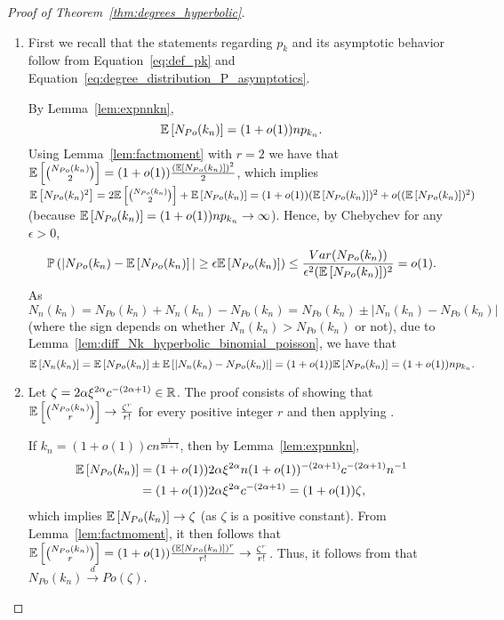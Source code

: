 \begin{proof}[Proof of Theorem~\ref{thm:degrees_hyperbolic}] \hfill\\
\begin{enumerate}[\upshape (i)]
\item  First we recall that the statements regarding $p_k$ and its asymptotic behavior follow from Equation~\ref{eq:def_pk} and Equation~\ref{eq:degree_distribution_P_asymptotics}.

By Lemma~\ref{lem:expnnkn},
\[
\mathbb{E}\left[{ N_{Po}(k_n) }\right]=(1+o(1))n p_{k_n}.
\]
Using Lemma~\ref{lem:factmoment} with $r=2$ we have that $\mathbb{E}\left[{N_{Po}(k_n) \choose 2}\right] = (1+o(1))\frac{(\mathbb{E}\left[ N_{Po}(k_n)\right])^2}{2}$, which implies $\mathbb{E}\left[N_{Po}(k_n)^2\right] = 2\mathbb{E}\left[{N_{Po}(k_n) \choose 2}\right] +\mathbb{E}\left[N_{Po}(k_n)\right] = (1+o(1))(\mathbb{E}\left[ N_{Po}(k_n)\right])^2 +o((\mathbb{E}\left[N_{Po}(k_n)\right])^2)$ (because $\mathbb{E}\left[N_{Po}(k_n)\right] = (1+o(1)) np_{k_n} \rightarrow \infty$). Hence, by Chebychev for any $\epsilon >0$,
\[
	\mathbb{P}\left(|N_{Po}(k_n)-\mathbb{E}\left[N_{Po}(k_n)\right]|\geq \epsilon \mathbb{E}\left[N_{Po}(k_n)\right]\right)
	\leq \frac{Var(N_{Po}(k_n))}{\epsilon^2 (\mathbb{E}\left[ N_{Po}(k_n)\right])^2} = o(1).
\]
As $N_n(k_n)=N_{Po}(k_n)+N_n(k_n)-N_{Po}(k_n) = N_{Po}(k_n)\pm |N_n(k_n)-N_{Po}(k_n)|$ (where the sign depends on whether $N_n(k_n)>N_{Po}(k_n)$ or not), due to Lemma~\ref{lem:diff_Nk_hyperbolic_binomial_poisson}, we have that
\[
	\mathbb{E}\left[N_n(k_n)\right] = \mathbb{E}\left[N_{Po}(k_n)\right] \pm \mathbb{E}\left[ |N_n(k_n)-N_{Po}(k_n)|\right] = (1+o(1))\mathbb{E}\left[N_{Po}(k_n)\right] = (1+o(1))n p_{k_n}.
\]

\item Let $\zeta = 2\alpha \xi^{2\alpha}c^{-(2\alpha+1)} \in {\ensuremath{\mathbb R}}$.
The proof consists of showing that $\mathbb{E}\left[{N_{Po}(k_n) \choose r} \right] \rightarrow \frac{\zeta^r}{r!}$ for every positive integer $r$ and then applying \cite[Theorem 8.3.1]{alon2016probabilistic}.

If $k_n=(1+o(1))c n^{\frac{1}{2\alpha+1}}$, then by Lemma~\ref{lem:expnnkn},
\begin{align*}
	\mathbb{E}\left[N_{Po}(k_n)\right] &= (1+o(1))2\alpha \xi^{2\alpha} n (1+o(1))^{-(2\alpha+1)} c^{-(2\alpha+1)}n^{-1} \\
	&= (1+o(1))2\alpha \xi^{2\alpha} c^{-(2\alpha+1)}=(1+o(1))\zeta,
\end{align*}
which implies $\mathbb{E}\left[N_{Po}(k_n)\right] \rightarrow \zeta$ (as $\zeta$ is a positive constant). From Lemma~\ref{lem:factmoment}, it then follows that $\mathbb{E}\left[{N_{Po}(k_n) \choose r}\right] =(1+o(1))\frac{(\mathbb{E}\left[ N_{Po}(k_n)\right])^r}{r!}\rightarrow \frac{\zeta^r}{r!}$. Thus, it follows from \cite[Theorem 8.3.1]{alon2016probabilistic} that $N_{Po}(k_n) \xrightarrow{d} Po(\zeta)$.


\end{enumerate}
\end{proof}
